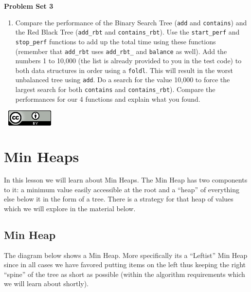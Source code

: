 \documentclass[
]{book}
\providecommand{\tightlist}{%
  \setlength{\itemsep}{0pt}\setlength{\parskip}{0pt}}
\begin{document}
\begin{problembox}

\textbf{Problem Set 3}

\begin{enumerate}
\def\labelenumi{\arabic{enumi}.}
\tightlist
\item
  Compare the performance of the Binary Search Tree (\texttt{add} and \texttt{contains}) and the Red Black Tree (\texttt{add\_rbt} and \texttt{contains\_rbt}). Use the \texttt{start\_perf} and \texttt{stop\_perf} functions to add up the total time using these functions (remember that \texttt{add\_rbt} uses \texttt{add\_rbt\_} and \texttt{balance} as well). Add the numbers 1 to 10,000 (the list is already provided to you in the test code) to both data structures in order using a \texttt{foldl}. This will result in the worst unbalanced tree using \texttt{add}. Do a search for the value 10,000 to force the largest search for both \texttt{contains} and \texttt{contains\_rbt}). Compare the performances for our 4 functions and explain what you found.
\end{enumerate}

\end{problembox}

\(\nonumber\)
\(\nonumber\)
\href{http://creativecommons.org/licenses/by/4.0/}{\includegraphics{images/cc-88x31.png}}

\hypertarget{min-heaps}{%
\chapter{Min Heaps}\label{min-heaps}}

In this lesson we will learn about Min Heaps. The Min Heap has two components to it: a minimum value easily accessible at the root and a ``heap'' of everything else below it in the form of a tree. There is a strategy for that heap of values which we will explore in the material below.

\hypertarget{min-heap}{%
\section{Min Heap}\label{min-heap}}

The diagram below shows a Min Heap. More specifically its a ``Leftist'' Min Heap since in all cases we have favored putting items on the left thus keeping the right ``spine'' of the tree as short as possible (within the algorithm requirements which we will learn about shortly).
\end{document}
